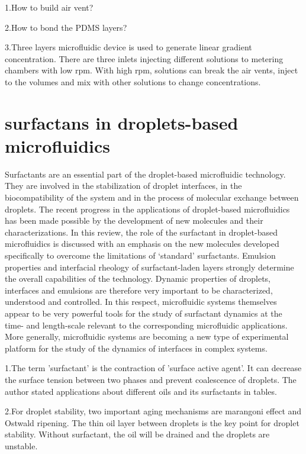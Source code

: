 \documentclass{article}
\begin{document}

1.How to build air vent?

2.How to bond the PDMS layers?

3.Three layers microfluidic device is used to generate linear gradient concentration. There are three inlets injecting different solutions to metering chambers with low rpm. With high rpm, solutions can break the air vents, inject to the volumes and mix with other solutions to change concentrations.

\part{surfactans in droplets-based microfluidics}

Surfactants are an essential part of the droplet-based microfluidic technology. They are involved in the stabilization of droplet interfaces, in the biocompatibility of the system and in the process of molecular exchange between droplets. The recent progress in the applications of droplet-based microfluidics has been made possible by the development of new molecules and their characterizations. In this review, the role of the surfactant in droplet-based microfluidics is discussed with an emphasis on the new molecules developed specifically to overcome the limitations of ‘standard’ surfactants. Emulsion properties and interfacial rheology of surfactant-laden layers strongly determine the overall capabilities of the technology. Dynamic properties of droplets, interfaces and emulsions are therefore very important to be characterized, understood and controlled. In this respect, microfluidic systems themselves appear to be very powerful tools for the study of surfactant dynamics at the time- and length-scale relevant to the corresponding microfluidic applications. More generally, microfluidic systems are becoming a new type of experimental platform for the study of the dynamics of interfaces in complex systems.

1.The term 'surfactant' is the contraction of 'surface active agent'. It can decrease the surface tension between two phases and prevent coalescence of droplets. The author stated applications about different oils and its surfactants in tables. 

2.For droplet stability, two important aging mechanisms are marangoni effect and Ostwald ripening. The thin oil layer between droplets is the key point for droplet stability. Without surfactant, the oil will be drained and the droplets are unstable.
\end{document}
